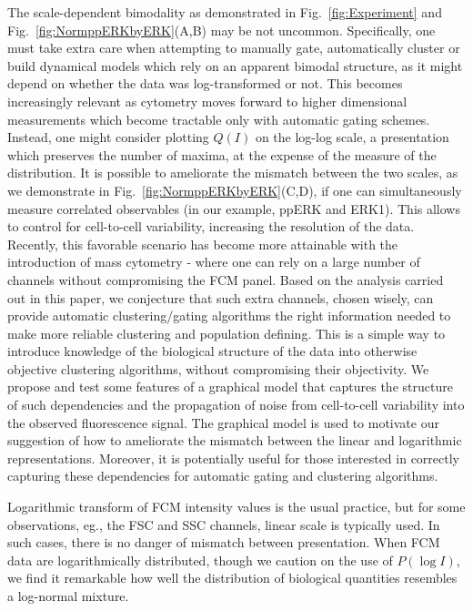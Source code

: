 \documentclass[11pt,a4paper,draft]{article}
\begin{document}
\smallskip
The scale-dependent bimodality as demonstrated in Fig.~\ref{fig:Experiment} and Fig.~\ref{fig:NormppERKbyERK}(A,B) may be not uncommon. Specifically, one must take extra care when attempting to manually gate, automatically cluster or build dynamical models which rely on an apparent bimodal structure, as it might depend on whether the data was log-transformed or not. This becomes increasingly relevant as cytometry moves forward to higher dimensional measurements which become tractable only with automatic gating schemes. Instead, one might consider plotting $Q(I)$ on the log-log scale, a presentation which preserves the number of maxima, at the expense of the measure of the distribution. It is possible to ameliorate the mismatch between the two scales, as we demonstrate in Fig.~\ref{fig:NormppERKbyERK}(C,D), if one can simultaneously measure correlated observables (in our example, ppERK and ERK1). This allows to control for cell-to-cell variability, increasing the resolution of the data. Recently, this favorable scenario has become more attainable with the introduction of mass cytometry - where one can rely on a large number of channels without compromising the FCM panel. Based on the analysis carried out in this paper, we conjecture that such extra channels, chosen wisely, can provide automatic clustering/gating algorithms the right information needed to make more reliable clustering and population defining. This is a simple way to introduce knowledge of the biological structure of the data into otherwise objective clustering algorithms, without compromising their objectivity. We propose and test some features of a graphical model that captures the structure of such dependencies and the propagation of noise from cell-to-cell variability into the observed fluorescence signal. The graphical model is used to motivate our suggestion of how to ameliorate the mismatch between the linear and logarithmic representations. Moreover, it is potentially useful for those interested in correctly capturing these dependencies for automatic gating and clustering algorithms. 

\smallskip 
Logarithmic transform of FCM intensity values is the usual practice, but for some observations, eg., the FSC and SSC channels, linear scale is typically used. In such cases, there is no danger of mismatch between presentation. When FCM data are logarithmically distributed, though we caution on the use of $P(\log I)$, we find it remarkable how well the distribution of biological quantities resembles a log-normal mixture. 
\end{document}

